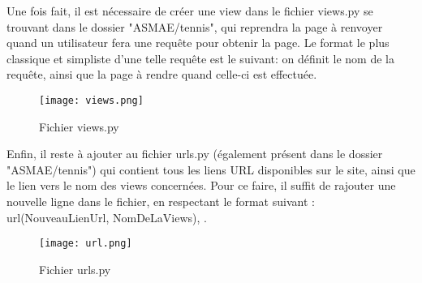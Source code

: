 Une fois fait, il est nécessaire de créer une view dans le fichier views.py se trouvant dans le dossier "ASMAE/tennis", qui reprendra la page à renvoyer quand un utilisateur fera une requête pour obtenir la page. Le format le plus classique et simpliste d'une telle requête est le suivant: on définit le nom de la requête, ainsi que la page à rendre quand celle-ci est effectuée.\\

\begin{figure}[H]
\centering
\texttt{[image: views.png]}
\caption{Fichier views.py}
\end{figure}

Enfin, il reste à ajouter au fichier urls.py (également présent dans le dossier "ASMAE/tennis") qui contient tous les liens URL disponibles sur le site, ainsi que le lien vers le nom des views concernées. Pour ce faire, il suffit de rajouter une nouvelle ligne dans le fichier, en respectant le format suivant : url(NouveauLienUrl, NomDeLaViews), .

\begin{figure}[H]
\centering
\texttt{[image: url.png]}
\caption{Fichier urls.py}
\end{figure}
